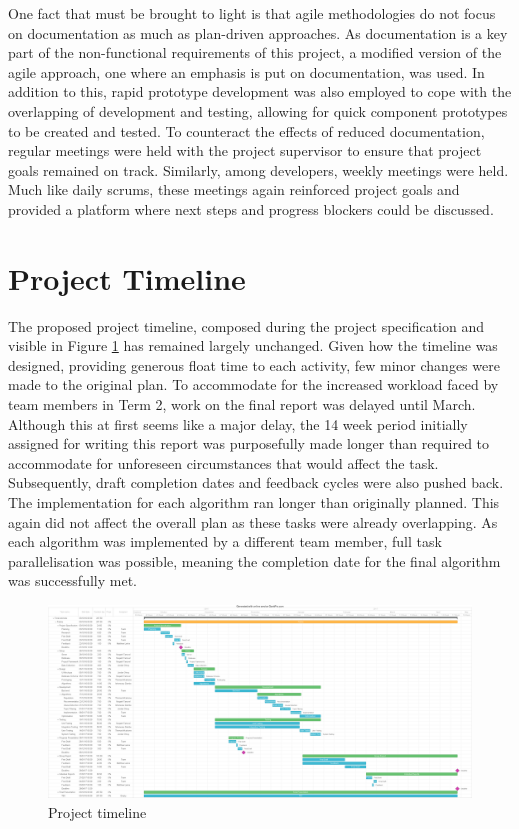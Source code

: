 One fact that must be brought to light is that agile methodologies do not focus on documentation as much as plan-driven approaches. As documentation is a key part of the non-functional requirements of this project, a modified version of the agile approach, one where an emphasis is put on documentation, was used. In addition to this, rapid prototype development was also employed to cope with the overlapping of development and testing, allowing for quick component prototypes to be created and tested. To counteract the effects of reduced documentation, regular meetings were held with the project supervisor to ensure that project goals remained on track. Similarly, among developers, weekly meetings were held. Much like daily scrums, these meetings again reinforced project goals and provided a platform where next steps and progress blockers could be discussed.

\section{Project Timeline}
The proposed project timeline, composed during the project specification and visible in Figure \ref{fig:timeline} has remained largely unchanged. Given how the timeline was designed, providing generous float time to each activity, few minor changes were made to the original plan. To accommodate for the increased workload faced by team members in Term 2, work on the final report was delayed until March. Although this at first seems like a major delay, the 14 week period initially assigned for writing this report was purposefully made longer than required to accommodate for unforeseen circumstances that would affect the task. Subsequently, draft completion dates and feedback cycles were also pushed back. The implementation for each algorithm ran longer than originally planned. This again did not affect the overall plan as these tasks were already overlapping. As each algorithm was implemented by a different team member, full task parallelisation was possible, meaning the completion date for the final algorithm was successfully met.

\begin{figure}[H]
  \centering
  \includegraphics[width=1.0\textwidth]{Images/ProjectManagement/timeline}
  \caption{Project timeline} 
  \label{fig:timeline} 
\end{figure}


